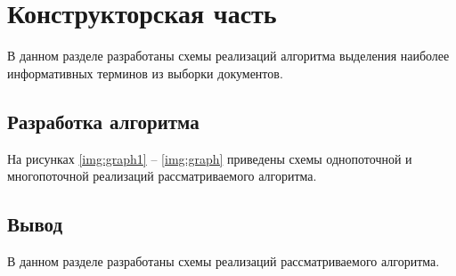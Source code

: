 
\chapter{Конструкторская часть}
В данном разделе разработаны схемы реализаций алгоритма выделения наиболее информативных терминов из выборки документов.
\section{Разработка алгоритма}

На рисунках \ref{img:graph1} -- \ref{img:graph} приведены схемы однопоточной и многопоточной реализаций рассматриваемого алгоритма.
\clearpage
{}
\clearpage
{}

\section*{Вывод}
В данном разделе разработаны схемы реализаций рассматриваемого алгоритма.